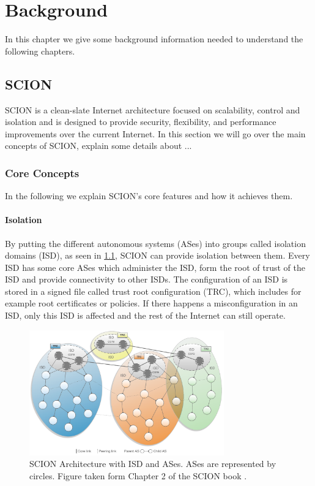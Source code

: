 \chapter{Background}
\label{ch:background}



In this chapter we give some background information needed to understand the following chapters.


\section{SCION}

SCION \cite{Perrig2022} is a clean-slate Internet architecture focused on scalability, control and isolation and is designed to provide security, flexibility, and performance improvements over the current Internet.
In this section we will go over the main concepts of SCION, explain some details about ...


\subsection{Core Concepts}
In the following we explain SCION's core features and how it achieves them.
\subsubsection{Isolation}

By putting the different autonomous systems (ASes) into groups called isolation domains (ISD), as seen in \cref{fig:scion_isd_architecture}, SCION can provide isolation between them.
Every ISD has some core ASes which administer the ISD, form the root of trust of the ISD and provide connectivity to other ISDs.
The configuration of an ISD is stored in a signed file called trust root configuration (TRC), which includes for example root certificates or policies.
If there happens a misconfiguration in an ISD, only this ISD is affected and the rest of the Internet can still operate.

\begin{figure}
    \centering
    \includegraphics[width=0.75\textwidth]{figures/scion_isd_architecture.png}
    \caption{SCION Architecture with ISD and ASes. ASes are represented by circles. Figure taken form Chapter 2 of the SCION book \cite{Perrig2022}.}
    \label{fig:scion_isd_architecture}
\end{figure}


